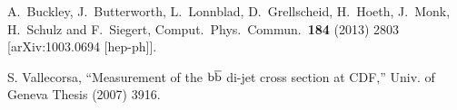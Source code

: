 \documentclass[a4paper,12pt]{article}
\begin{document}
\begin{thebibliography}{99}
  A.~Buckley, J.~Butterworth, L.~Lonnblad, D.~Grellscheid, H.~Hoeth, J.~Monk, H.~Schulz and F.~Siegert,
  Comput.\ Phys.\ Commun.\  {\bf 184} (2013) 2803
  [arXiv:1003.0694 [hep-ph]].

  S. Vallecorsa,
  ``Measurement of the ${\mathrm b}\overline{\mathrm b}$ di-jet cross section at CDF,''
  Univ. of Geneva Thesis (2007) 3916.

\end{thebibliography}

\end{document}
